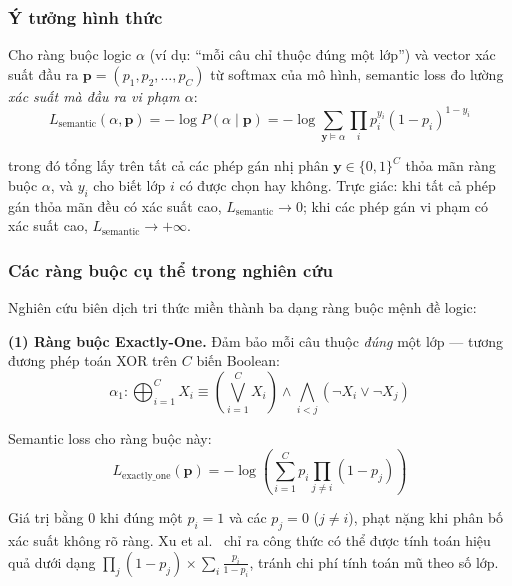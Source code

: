\subsubsection{Ý tưởng hình thức}

Cho ràng buộc logic $\alpha$ (ví dụ: ``mỗi câu chỉ thuộc đúng một lớp'') và vector xác suất đầu ra $\mathbf{p} = (p_1, p_2, \ldots, p_C)$ từ softmax của mô hình, semantic loss đo lường \textit{xác suất mà đầu ra vi phạm $\alpha$}:
\begin{equation}
    L_{\text{semantic}}(\alpha, \mathbf{p}) = -\log P(\alpha \mid \mathbf{p}) = -\log \sum_{\mathbf{y} \models \alpha} \prod_{i} p_i^{y_i}(1-p_i)^{1-y_i}
    \label{eq:semantic_loss_general}
\end{equation}

\noindent trong đó tổng lấy trên tất cả các phép gán nhị phân $\mathbf{y} \in \{0,1\}^C$ thỏa mãn ràng buộc $\alpha$, và $y_i$ cho biết lớp $i$ có được chọn hay không. Trực giác: khi tất cả phép gán thỏa mãn đều có xác suất cao, $L_{\text{semantic}} \rightarrow 0$; khi các phép gán vi phạm có xác suất cao, $L_{\text{semantic}} \rightarrow +\infty$.


\subsubsection{Các ràng buộc cụ thể trong nghiên cứu}

Nghiên cứu biên dịch tri thức miền thành ba dạng ràng buộc mệnh đề logic:

\textbf{(1) Ràng buộc Exactly-One.} Đảm bảo mỗi câu thuộc \textit{đúng} một lớp --- tương đương phép toán XOR trên $C$ biến Boolean:
\begin{equation}
    \alpha_1: \bigoplus_{i=1}^{C} X_i \equiv \left(\bigvee_{i=1}^{C} X_i\right) \wedge \bigwedge_{i < j} \left(\neg X_i \vee \neg X_j\right)
\end{equation}

Semantic loss cho ràng buộc này:
\begin{equation}
    L_{\text{exactly\_one}}(\mathbf{p}) = -\log\left(\sum_{i=1}^{C} p_i \prod_{j \neq i}(1 - p_j)\right)
    \label{eq:exactly_one}
\end{equation}

\noindent Giá trị bằng 0 khi đúng một $p_i = 1$ và các $p_j = 0$ ($j \neq i$), phạt nặng khi phân bố xác suất không rõ ràng. Xu et al.~\cite{xu2018semantic} chỉ ra công thức có thể được tính toán hiệu quả dưới dạng $\prod_j(1-p_j) \times \sum_i \frac{p_i}{1-p_i}$, tránh chi phí tính toán mũ theo số lớp.


